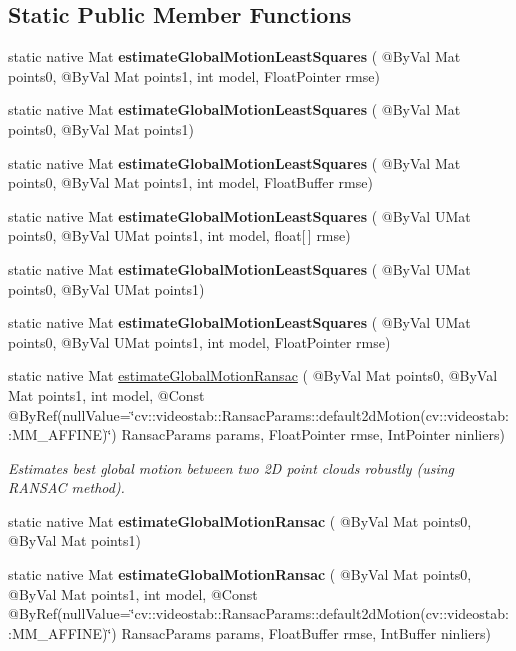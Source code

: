 \subsection*{Static Public Member Functions}
\begin{DoxyCompactItemize}
\item 
static native Mat {\bfseries estimate\+Global\+Motion\+Least\+Squares} ( @By\+Val Mat points0, @By\+Val Mat points1, int model, Float\+Pointer rmse)
\item 
static native Mat {\bfseries estimate\+Global\+Motion\+Least\+Squares} ( @By\+Val Mat points0, @By\+Val Mat points1)
\item 
static native Mat {\bfseries estimate\+Global\+Motion\+Least\+Squares} ( @By\+Val Mat points0, @By\+Val Mat points1, int model, Float\+Buffer rmse)
\item 
static native Mat {\bfseries estimate\+Global\+Motion\+Least\+Squares} ( @By\+Val U\+Mat points0, @By\+Val U\+Mat points1, int model, float\mbox{[}$\,$\mbox{]} rmse)
\item 
static native Mat {\bfseries estimate\+Global\+Motion\+Least\+Squares} ( @By\+Val U\+Mat points0, @By\+Val U\+Mat points1)
\item 
static native Mat {\bfseries estimate\+Global\+Motion\+Least\+Squares} ( @By\+Val U\+Mat points0, @By\+Val U\+Mat points1, int model, Float\+Pointer rmse)
\item 
static native Mat \hyperlink{group__videostab__motion_gab1399e69e37b80626504e158be509601}{estimate\+Global\+Motion\+Ransac} ( @By\+Val Mat points0, @By\+Val Mat points1, int model, @Const @By\+Ref(null\+Value=\char`\"{}cv\+::videostab\+::\+Ransac\+Params\+::default2d\+Motion(cv\+::videostab\+::\+M\+M\+\_\+\+A\+F\+F\+I\+NE)\char`\"{}) Ransac\+Params params, Float\+Pointer rmse, Int\+Pointer ninliers)
\begin{DoxyCompactList}\small\item\em Estimates best global motion between two 2D point clouds robustly (using R\+A\+N\+S\+AC method). \end{DoxyCompactList}\item 
static native Mat {\bfseries estimate\+Global\+Motion\+Ransac} ( @By\+Val Mat points0, @By\+Val Mat points1)
\item 
static native Mat {\bfseries estimate\+Global\+Motion\+Ransac} ( @By\+Val Mat points0, @By\+Val Mat points1, int model, @Const @By\+Ref(null\+Value=\char`\"{}cv\+::videostab\+::\+Ransac\+Params\+::default2d\+Motion(cv\+::videostab\+::\+M\+M\+\_\+\+A\+F\+F\+I\+NE)\char`\"{}) Ransac\+Params params, Float\+Buffer rmse, Int\+Buffer ninliers)

\end{DoxyCompactItemize}
